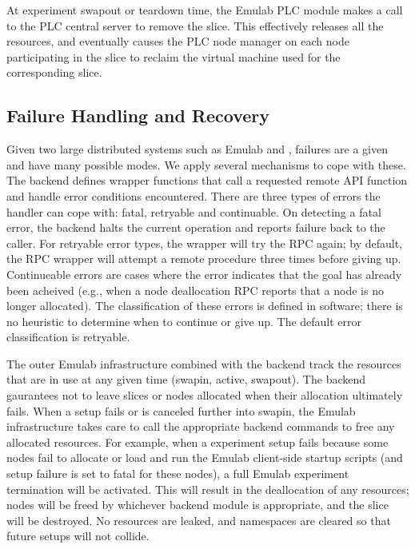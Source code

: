 At experiment swapout or teardown time, the Emulab PLC module makes a
call to the PLC central server to remove the slice.  This effectively
releases all the resources, and eventually causes the PLC node manager
on each node participating in the slice to reclaim the virtual machine
used for the corresponding slice.

\subsection{Failure Handling and Recovery}

Given two large distributed systems such as Emulab and \plab, failures
are a given and have many possible modes.  We apply several mechanisms
to cope with these.  The \plab backend defines wrapper functions that
call a requested remote API function and handle error conditions
encountered.  There are three types of errors the handler can cope
with: fatal, retryable and continuable.  On detecting a fatal error,
the backend halts the current operation and reports failure back to
the caller.  For retryable error types, the wrapper will try the RPC
again; by default, the RPC wrapper will attempt a remote procedure
three times before giving up.  Continueable errors are cases where the
error indicates that the goal has already been acheived (e.g., when a
node deallocation RPC reports that a node is no longer allocated).
The classification of these errors is defined in software; there is no
heuristic to determine when to continue or give up.  The default
error classification is retryable.

The outer Emulab infrastructure combined with the \plab backend track
the resources that are in use at any given time (swapin, active,
swapout).  The \plab backend gaurantees not to leave slices or nodes
allocated when their allocation ultimately fails.  When a setup fails
or is canceled further into swapin, the Emulab infrastructure takes
care to call the appropriate \plab backend commands to free any
allocated resources.  For example, when a \plab experiment setup fails
because some nodes fail to allocate or load and run the Emulab
client-side startup scripts (and setup failure is set to fatal for
these nodes), a full Emulab experiment termination will be activated.
This will result in the deallocation of any resources; \plab nodes
will be freed by whichever backend module is appropriate, and the
slice will be destroyed.  No resources are leaked, and namespaces are
cleared so that future setups will not collide.

